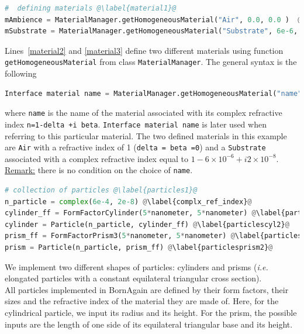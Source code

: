 

\begin{lstlisting}[language=python, style=eclipseboxed,name=ex1,nolol]
#  defining materials @\label{material1}@
mAmbience = MaterialManager.getHomogeneousMaterial("Air", 0.0, 0.0 )  @\label{material2}@
mSubstrate = MaterialManager.getHomogeneousMaterial("Substrate", 6e-6, 2e-8) @\label{material3}@
\end{lstlisting}

\noindent Lines~\ref{material2} and \ref{material3} define two different
materials using function \texttt{getHomogeneousMaterial} from class
\texttt{MaterialManager}. The general syntax is the following 

\begin{lstlisting}[language=python, style=eclipse,numbers=none]
Interface material name = MaterialManager.getHomogeneousMaterial("name", delta, beta)
\end{lstlisting}

\noindent where \texttt{name} is the name of the
material associated with its complex refractive index
\texttt{n=1-delta +i beta}. \texttt{Interface material name} is later used when
referring to this particular material. The two defined materials in this example are \texttt{Air} with a refractive
index of 1 (\texttt{delta = beta =0}) and a \texttt{Substrate} associated with a complex refractive index
equal to $1-6\times 10^{-6} +i2\times 10^{-8} $. \\

\noindent \underline{Remark:} there is no condition on the choice of
\texttt{name}. 


\begin{lstlisting}[language=python,
  style=eclipseboxed,name=ex1,nolol]
# collection of particles @\label{particles1}@
n_particle = complex(6e-4, 2e-8) @\label{complx_ref_index}@
cylinder_ff = FormFactorCylinder(5*nanometer, 5*nanometer) @\label{particlescyl1}@
cylinder = Particle(n_particle, cylinder_ff) @\label{particlescyl2}@
prism_ff = FormFactorPrism3(5*nanometer, 5*nanometer) @\label{particlesprism1}@
prism = Particle(n_particle, prism_ff) @\label{particlesprism2}@
\end{lstlisting}

 \noindent We implement two different shapes of particles: cylinders and
 prisms (\textit{i.e.} elongated particles with a constant equilateral triangular cross section).\\ All particles implemented in BornAgain are defined by their
 form factors, their sizes and the refractive index of the material
  they are made of. Here, for the
  cylindrical particle, we input its radius and its height.  For the prism, 
  the possible inputs are the length of one side of its equilateral triangular
  base and its height.\\

